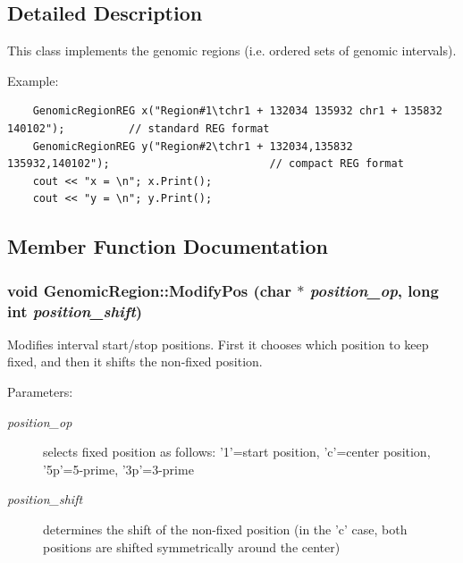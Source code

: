 \subsection{Detailed Description}
This class implements the genomic regions (i.e. ordered sets of genomic intervals). 

Example: 

\begin{Code}\begin{verbatim}    GenomicRegionREG x("Region#1\tchr1 + 132034 135932 chr1 + 135832 140102");          // standard REG format
    GenomicRegionREG y("Region#2\tchr1 + 132034,135832 135932,140102");                         // compact REG format
    cout << "x = \n"; x.Print();
    cout << "y = \n"; y.Print(); 
\end{verbatim}
\end{Code}

 

\subsection{Member Function Documentation}
\hypertarget{classGenomicRegion_0721b07af0850057e4ab9cd416ecac2f}{
\subsubsection[ModifyPos]{\setlength{\rightskip}{0pt plus 5cm}void GenomicRegion::ModifyPos (char $\ast$ {\em position\_\-op}, \/  long int {\em position\_\-shift})}}
\label{classGenomicRegion_0721b07af0850057e4ab9cd416ecac2f}


Modifies interval start/stop positions. First it chooses which position to keep fixed, and then it shifts the non-fixed position. 

\begin{Desc}
\item[Parameters:]
\begin{description}
\item[{\em position\_\-op}]selects fixed position as follows: '1'=start position, 'c'=center position, '5p'=5-prime, '3p'=3-prime \item[{\em position\_\-shift}]determines the shift of the non-fixed position (in the 'c' case, both positions are shifted symmetrically around the center) \end{description}
\end{Desc}


